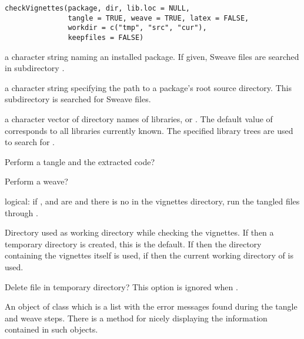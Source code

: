%
\begin{Usage}
\begin{verbatim}
checkVignettes(package, dir, lib.loc = NULL,
               tangle = TRUE, weave = TRUE, latex = FALSE,
               workdir = c("tmp", "src", "cur"),
               keepfiles = FALSE)
\end{verbatim}
\end{Usage}
%
\begin{Arguments}
\begin{ldescription}
\item[\code{package}] a character string naming an installed package.  If
given, Sweave files are searched in subdirectory .
\item[\code{dir}] a character string specifying the path to a package's root
source directory.  This subdirectory  is searched for
Sweave files.
\item[\code{lib.loc}] a character vector of directory names of \R{} libraries,
or .  The default value of  corresponds to all
libraries currently known.  The specified library trees are used to
search for .
\item[\code{tangle}] Perform a tangle and  the extracted code?
\item[\code{weave}] Perform a weave?
\item[\code{latex}] logical: if ,  and 
are  and there is no  in the vignettes
directory, run the tangled files through .
\item[\code{workdir}] Directory used as working directory while checking the
vignettes. If  then a temporary directory is created,
this is the default.  If  then the directory containing
the vignettes itself is used, if  then the current
working directory of \R{} is used.
\item[\code{keepfiles}] Delete file in temporary directory?  This option is
ignored when .
\end{ldescription}
\end{Arguments}
%
\begin{Value}
An object of class  which is a list with the
error messages found during the tangle and weave steps. There is a
 method for nicely displaying the information 
contained in such objects.
\end{Value}
